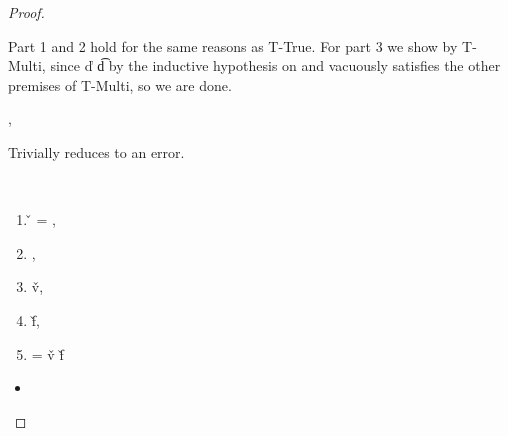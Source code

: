 \begin{lemma}
\begin{proof}
\begin{case}[B-DefMulti]
\begin{itemize}
\begin{subcase}[T-DefMulti]
Part 1 and 2 hold for the same reasons as T-True.
For part 3 we show 
by T-Multi, since \judgementtwo {} {\v{d}} {\t{d}} by the inductive hypothesis on {}
and {\emptydisptable} vacuously satisfies the other premises of T-Multi, so we are done.

\end{subcase}
\end{itemize}
\end{case}

\begin{case}[BE-DefMulti] \opsem {\openv{}} {} {\errorvalv{}},
        \opsem {\openv{}} {\e{}} {\errorvalv{}}

        Trivially reduces to an error.

\end{case}

\begin{case}[B-DefMethod]

        \ 

        \begin{enumerate}
          \item
       \v{} = { {\disptablep{}}},
          \item
        \opsem {\openv{}}
               {}
               { {\disptable{}}},
          \item
  \opsem {\openv{}}
         {}
         {\v{v}},
          \item
  \opsem {\openv{}}
         {}
         {\v{f}},
          \item
         \disptablep{} = {\extenddisptable {\disptable{}} 
                                {\v{v}}
                                {\v{f}}}
        \end{enumerate}

  \begin{itemize}
    \item[]
      \begin{subcase}[T-DefMethod]
        \ 
        
        \begin{enumerate}[resume]


\end{enumerate}
\end{subcase}
\end{itemize}
\end{case}
\end{proof}
\end{lemma}
